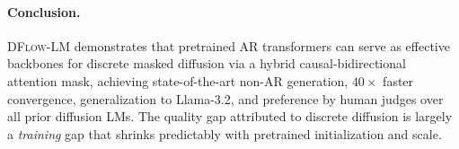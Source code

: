 \documentclass{article}
\newcommand{\ours}{\textsc{DFlow-LM}}
\begin{document}
\paragraph{Conclusion.}
\ours{} demonstrates that pretrained AR transformers can serve as effective backbones for discrete masked diffusion via a hybrid causal-bidirectional attention mask, achieving state-of-the-art non-AR generation, $40{\times}$ faster convergence, generalization to Llama-3.2, and preference by human judges over all prior diffusion LMs.
The quality gap attributed to discrete diffusion is largely a \emph{training} gap that shrinks predictably with pretrained initialization and scale.


\end{document}
